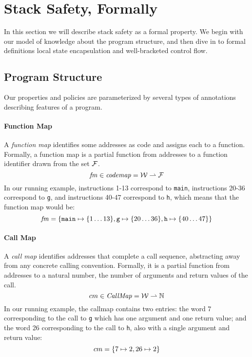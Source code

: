 \documentclass[acmsmall,review,anonymous]{acmart}\settopmatter{printfolios=true,printccs=false,printacmref=false}
\begin{document}
\section{Stack Safety, Formally}
\label{sec:lse-and-wbcf}

In this section we will describe stack safety as a formal property. We
begin with our model of  knowledge about the
program structure, and then dive in to formal definitions local state
encapsulation and well-bracketed control flow.

\subsection{Program Structure}

Our properties and policies are parameterized by several types of
annotations describing features of a program.

\paragraph*{Function Map}

A {\em function map} identifies some addresses as code and assigns
each to a function. Formally, a function map is a
partial function from addresses to a function
identifier drawn from the set \(\mathcal{F}\).
\[\mathit{fm} \in \mathit{codemap} = {\mathcal W} \rightharpoonup \mathcal{F}\]
%
In our running example, instructions 1-13 correspond to {\tt main},
instructions 20-36 correspond to {\tt g}, and instructions 40-47
correspond to {\tt h}, which means that the function map would be:
\[ \mathit{fm} = \{\texttt{main} \mapsto \{1\ldots13\}, \texttt{g} \mapsto \{20\ldots36\}, \texttt{h} \mapsto \{40\ldots47\}\}\]

\paragraph*{Call Map}

A {\em call map} identifies addresses that complete a call sequence,
abstracting away from any concrete calling convention. Formally, it is
a partial function from addresses to a natural number, the number of
arguments and return values of the call.
\[cm \in \mathit{CallMap} = {\mathcal W} \rightharpoonup \mathbb{N}\]
%
In our running example, the callmap contains two entries: the word 7
corresponding to the call to {\tt g} which has one argument and one
return value; and the word 26 corresponding to the call to {\tt h},
also with a single argument and return value:
\[ cm = \{ 7 \mapsto 2, 26 \mapsto 2\}\]
\end{document}
